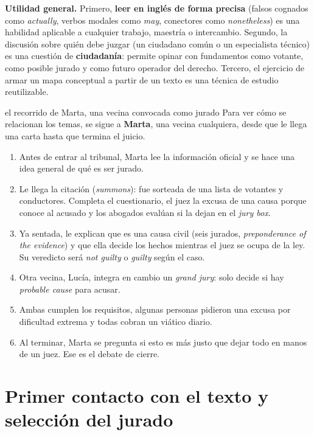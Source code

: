 \documentclass[12pt,oneside]{book}
\begin{document}
\textbf{Utilidad general.} Primero, \textbf{leer en inglés de forma precisa} (falsos cognados como \textit{actually}, verbos modales como \textit{may}, conectores como \textit{nonetheless}) es una habilidad aplicable a cualquier trabajo, maestría o intercambio. Segundo, la discusión sobre quién debe juzgar (un ciudadano común o un especialista técnico) es una cuestión de \textbf{ciudadanía}: permite opinar con fundamentos como votante, como posible jurado y como futuro operador del derecho. Tercero, el ejercicio de armar un mapa conceptual a partir de un texto es una técnica de estudio reutilizable.

\begin{example}{el recorrido de Marta, una vecina convocada como jurado}
Para ver cómo se relacionan los temas, se sigue a \textbf{Marta}, una vecina cualquiera, desde que le llega una carta hasta que termina el juicio.
\begin{enumerate}
\item Antes de entrar al tribunal, Marta lee la información oficial y se hace una idea general de qué es ser jurado.
\item Le llega la citación (\textit{summons}): fue sorteada de una lista de votantes y conductores. Completa el cuestionario, el juez la excusa de una causa porque conoce al acusado y los abogados evalúan si la dejan en el \textit{jury box}.
\item Ya sentada, le explican que es una causa civil (seis jurados, \textit{preponderance of the evidence}) y que ella decide los hechos mientras el juez se ocupa de la ley. Su veredicto será \textit{not guilty} o \textit{guilty} según el caso.
\item Otra vecina, Lucía, integra en cambio un \textit{grand jury}: solo decide si hay \textit{probable cause} para acusar.
\item Ambas cumplen los requisitos, algunas personas pidieron una excusa por dificultad extrema y todas cobran un viático diario.
\item Al terminar, Marta se pregunta si esto es más justo que dejar todo en manos de un juez. Ese es el debate de cierre.
\end{enumerate}
\end{example}

\chapter[Selección del jurado]{Primer contacto con el texto y selección del jurado}
\end{document}
